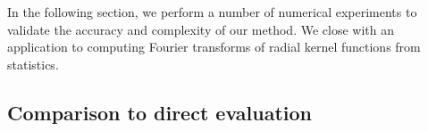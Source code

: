 In the following section, we perform a number of numerical experiments to
validate the accuracy and complexity of our method. We close with an application
to computing Fourier transforms of radial kernel functions from statistics.

\subsection{Comparison to direct evaluation}

\begin{figure}[t]
  \centering
  \newcommand\twa{0.29cm} \newcommand\tw{0.43cm}
  \begin{subfigure}[b]{0.32\textwidth}
  \end{subfigure}
  \hfill
  \begin{subfigure}[b]{0.32\textwidth}
    \begin{tikzpicture}

\end{tikzpicture}
\end{subfigure}
\end{figure}
